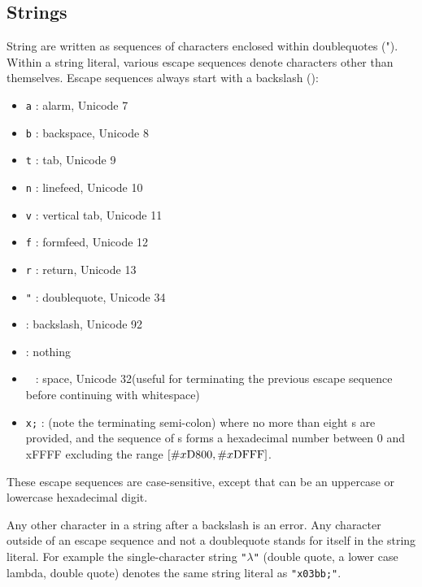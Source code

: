 \subsection{Strings}

\vest String are written as sequences of characters enclosed within doublequotes
({\cf "}).  Within a string literal, various escape
sequences denote characters other than
themselves.  Escape sequences always start with a backslash (\backwhack{}):

\begin{itemize}
\item{\tt \backwhack{}a} : alarm, Unicode 7
\item{\tt \backwhack{}b} : backspace, Unicode 8 
\item{\tt \backwhack{}t} : tab, Unicode 9 
\item{\tt \backwhack{}n} : linefeed, Unicode 10 
\item{\tt \backwhack{}v} : vertical tab, Unicode 11 
\item{\tt \backwhack{}f} : formfeed, Unicode 12 
\item{\tt \backwhack{}r} : return, Unicode 13 
\item{\tt \backwhack{}}\verb|"| : doublequote, Unicode 34 
\item{\tt \backwhack{}\backwhack{}} : backslash, Unicode 92 
\item{\tt \backwhack{}} : nothing
\item{\tt \backwhack{}\ } : space, Unicode 32(useful for terminating the
  previous escape sequence before continuing with whitespace)
\item{\tt \backwhack{}x;} : (note the
  terminating semi-colon) where no more than eight s
  are provided, and the sequence of s forms a
  hexadecimal number between 0 and \sharpsign{}xFFFF excluding the
  range $\left[{\tt\#}{}x\textrm{D800},
    {\tt\#}{}x\textrm{DFFF}\right]$.
\end{itemize}

These escape sequences are case-sensitive, except that  can be an uppercase or lowercase hexadecimal digit.

Any other character in a string after a backslash is an error. Any
character outside of an escape sequence and not a doublequote stands
for itself in the string literal. For example the single-character
string {\tt "$\lambda$"} (double quote, a lower case lambda, double
quote) denotes the same string literal as {\tt "\backwhack{}x03bb;"}.


